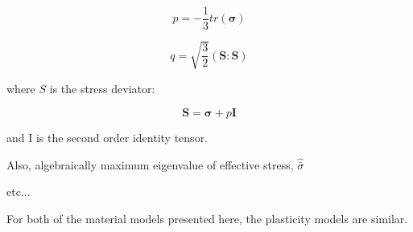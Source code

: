 \begin{equation}
p=-\frac{1}{3}tr\left(\boldsymbol{\sigma}\right)\label{eqn:druc3}
\end{equation}


\begin{equation}
q=\sqrt{\frac{3}{2}}\left(\mathbf{S}:\mathbf{S}\right)\label{eqn:druc4}
\end{equation}


where $S$ is the stress deviator:

\begin{equation}
\mathbf{S}=\boldsymbol{\sigma}+p\mathbf{I}\label{eqn:druc4-1}
\end{equation}


and I is the second order identity tensor. 


Also, algebraically maximum eigenvalue of effective stress, $\hat{\bar{\sigma}}$


etc...

For both of the material models presented here, the plasticity models are similar. 